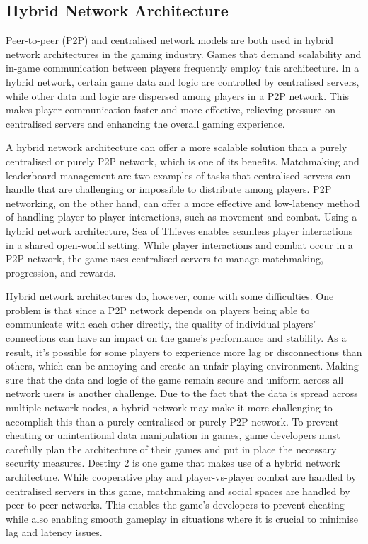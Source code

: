 \subsection{Hybrid Network Architecture}

Peer-to-peer (P2P) and centralised network models are both used in hybrid network architectures in the gaming industry. Games that demand scalability and in-game communication between players frequently employ this architecture.
In a hybrid network, certain game data and logic are controlled by centralised servers, while other data and logic are dispersed among players in a P2P network. This makes player communication faster and more effective, relieving pressure on centralised servers and enhancing the overall gaming experience.\cite{ferguson2015multiplayer}

A hybrid network architecture can offer a more scalable solution than a purely centralised or purely P2P network, which is one of its benefits. Matchmaking and leaderboard management are two examples of tasks that centralised servers can handle that are challenging or impossible to distribute among players. P2P networking, on the other hand, can offer a more effective and low-latency method of handling player-to-player interactions, such as movement and combat.\cite{ferguson2015multiplayer}\cite{blattner2016network}
Using a hybrid network architecture, Sea of Thieves enables seamless player interactions in a shared open-world setting. While player interactions and combat occur in a P2P network, the game uses centralised servers to manage matchmaking, progression, and rewards.\cite{rare2021sea}

Hybrid network architectures do, however, come with some difficulties. One problem is that since a P2P network depends on players being able to communicate with each other directly, the quality of individual players' connections can have an impact on the game's performance and stability. As a result, it's possible for some players to experience more lag or disconnections than others, which can be annoying and create an unfair playing environment.\cite{hadavi2020security}\cite{amann2016benefits}
Making sure that the data and logic of the game remain secure and uniform across all network users is another challenge. Due to the fact that the data is spread across multiple network nodes, a hybrid network may make it more challenging to accomplish this than a purely centralised or purely P2P network. To prevent cheating or unintentional data manipulation in games, game developers must carefully plan the architecture of their games and put in place the necessary security measures.\cite{hadavi2020security}
Destiny 2 is one game that makes use of a hybrid network architecture. While cooperative play and player-vs-player combat are handled by centralised servers in this game, matchmaking and social spaces are handled by peer-to-peer networks. This enables the game's developers to prevent cheating while also enabling smooth gameplay in situations where it is crucial to minimise lag and latency issues.\cite{bungie2021destiny}

